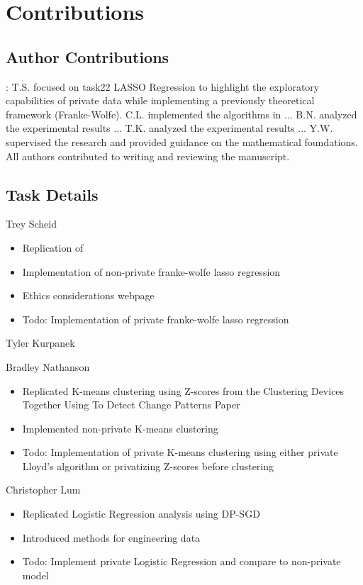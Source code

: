 \documentclass[12pt,letterpaper]{article}
\begin{document}
\section{Contributions}

\subsection{Author Contributions}:
T.S. focused on task22 LASSO Regression to highlight the exploratory capabilities of private data while implementing a previously theoretical framework (Franke-Wolfe). C.L. implemented the algorithms in ... B.N. analyzed the experimental results ... T.K. analyzed the experimental results ... Y.W. supervised the research and provided guidance on the mathematical foundations. All authors contributed to writing and reviewing the manuscript.

\subsection{Task Details}

Trey Scheid
\begin{itemize}
    \item Replication of 
    \item Implementation of non-private franke-wolfe lasso regression
    \item Ethics considerations webpage
    \item [ ] Todo: Implementation of private franke-wolfe lasso regression
\end{itemize}

Tyler Kurpanek

Bradley Nathanson
\begin{itemize}
    \item Replicated K-means clustering using Z-scores from the Clustering Devices Together Using To Detect Change Patterns Paper
    \item Implemented non-private K-means clustering 
    \item [ ] Todo: Implementation of private K-means clustering using either private Lloyd's algorithm or privatizing Z-scores before clustering
\end{itemize}

Christopher Lum
\begin{itemize}
    \item Replicated Logistic Regression analysis using DP-SGD
    \item Introduced methods for engineering data
    \item [ ] Todo: Implement private Logistic Regression and compare to non-private model
\end{itemize}
\end{document}
